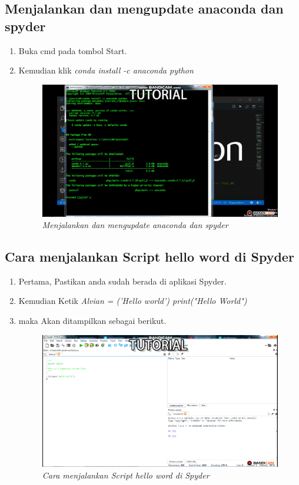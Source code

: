 \subsection{Menjalankan dan mengupdate anaconda dan spyder}
\begin{enumerate}
    \item Buka cmd pada tombol Start.
    \item Kemudian klik \textit{conda install -c anaconda python}
    \begin{figure}[!htbp]
    \centering
    \includegraphics[scale=0.2]{figures/25.PNG}
    \caption{\textit{Menjalankan dan mengupdate anaconda dan spyder}}
    \label{Figurepython}
    \end{figure}
\end{enumerate}
\subsection{Cara menjalankan Script hello word di Spyder}
\begin{enumerate}
    \item Pertama, Pastikan anda sudah berada di aplikasi Spyder.
    \item Kemudian Ketik \textit{
    Alvian = ('Hello world')
    print("Hello World") }
\item maka Akan ditampilkan sebagai berikut.
    \begin{figure}[!htbp]
    \centering
    \includegraphics[scale=0.2]{figures/26.PNG}
    \caption{\textit{Cara menjalankan Script hello word di Spyder}}
    \label{Figurepython}
    \end{figure}
\end{enumerate}
